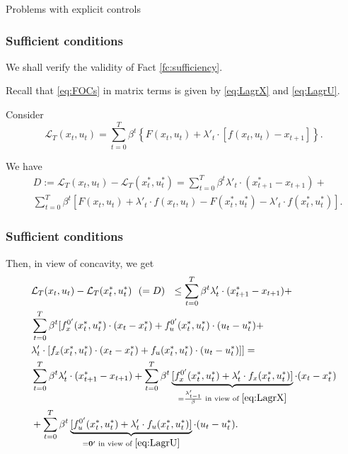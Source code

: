 \documentclass[10pt]{beamer}
\theoremstyle{definition}
\begin{document}
\begin{section}{Problems with explicit controls}
\begin{frame}[fragile]
\frametitle{Sufficient conditions}
We shall verify the validity of Fact \ref{fc:sufficiency}.\bigskip

Recall that \eqref{eq:FOCs} in matrix terms is given by \eqref{eq:LagrX} and \eqref{eq:LagrU}.

Consider \[ \mathcal{L}_T(x_t,u_t) = \sum_{t=0}^{T}\beta^t \left\{ F(x_t,u_t) + \lambda'_t \cdot [f(x_t,u_t)-x_{t+1}] \right\} .\]

We have \begin{equation}
\begin{split}
& D := \mathcal{L}_T (x_t,u_t) - \mathcal{L}_T(x^*_t,u^*_t) = \sum_{t=0}^{T}\beta^t \lambda'_t \cdot (x^*_{t+1} - x_{t+1} )+  \\
& \sum_{t=0}^{T}\beta^t [ F(x_t,u_t) + \lambda'_t \cdot f(x_t,u_t) 
- F(x^*_t,u^*_t) - \lambda'_t \cdot f(x^*_t,u^*_t) ].
\end{split}
\label{eq:LagrDiff}
\end{equation}
\end{frame}


\begin{frame}[fragile]
\frametitle{Sufficient conditions}
Then, in view of concavity, we get \begin{equation*}
\begin{split}
&\mathcal{L}_T (x_t,u_t) - \mathcal{L}_T(x^*_t,u^*_t) ~~(= D)~~ \leq \sum_{t=0}^{T}\beta^t \lambda'_t \cdot (x^*_{t+1} - x_{t+1} )+  \\
&\sum_{t=0}^{T}\beta^t [ f^{0'}_x(x^*_t,u^*_t)\cdot(x_t-x_t^*) +f^{0'}_u(x^*_t,u^*_t)\cdot(u_t-u_t^*) +\\
& \lambda'_t \cdot [f_x(x^*_t,u^*_t)\cdot(x_t-x_t^*) + f_u(x^*_t,u^*_t)\cdot (u_t-u_t^*) ]] = \\
& \sum_{t=0}^{T}\beta^t \lambda'_t \cdot (x^*_{t+1} - x_{t+1} )+  \sum_{t=0}^{T}\beta^t \underbrace{[f^{0'}_x(x^*_t,u^*_t) + \lambda'_t \cdot f_x(x^*_t,u^*_t)]}_{=\frac{\lambda'_{t-1}}{\beta} \text{ in view of }  \eqref{eq:LagrX} }\cdot(x_t-x_t^*)\\
& + \sum_{t=0}^{T}\beta^t \underbrace{[f^{0'}_u(x^*_t,u^*_t) + \lambda'_t \cdot f_u(x^*_t,u^*_t)]}_{=\mathbf{0}' \text{ in view of } \eqref{eq:LagrU}}\cdot(u_t-u_t^*).
\end{split}
\end{equation*}
\end{frame}




\end{section}
\end{document}

